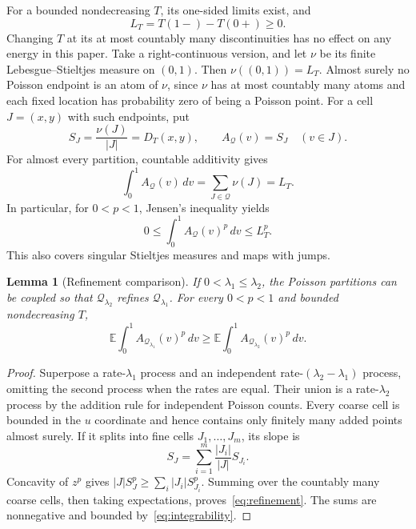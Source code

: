 \documentclass[11pt]{article}
\newtheorem{lemma}[theorem]{Lemma}
\theoremstyle{remark}
\newcommand{\E}{\mathbb E}
\newcommand{\dd}{\,d}
\begin{document}
For a bounded nondecreasing $T$, its one-sided limits exist, and
\[
 L_T=T(1-)-T(0+)\geq0.
\]
Changing $T$ at its at most countably many discontinuities has no effect
on any energy in this paper. Take a right-continuous version, and let
$\nu$ be its finite Lebesgue--Stieltjes measure on $(0,1)$.
Then $\nu((0,1))=L_T$.
Almost surely no Poisson endpoint is an atom of $\nu$, since $\nu$ has
at most countably many atoms and each fixed location has probability
zero of being a Poisson point.
For a cell $J=(x,y)$ with such endpoints, put
\[
 S_J=\frac{\nu(J)}{|J|}=D_T(x,y),
 \qquad A_{\mathcal Q}(v)=S_J\quad(v\in J).
\]
For almost every partition, countable additivity gives
\begin{equation}\label{eq:first-moment}
 \int_0^1 A_{\mathcal Q}(v)\dd v
 =\sum_{J\in\mathcal Q}\nu(J)=L_T.
\end{equation}
In particular, for $0<p<1$, Jensen's inequality yields
\begin{equation}\label{eq:integrability}
 0\leq\int_0^1 A_{\mathcal Q}(v)^p\dd v\leq L_T^p.
\end{equation}
This also covers singular Stieltjes measures and maps with jumps.

\begin{lemma}[Refinement comparison]\label{lem:refinement}
If $0<\lambda_1\leq\lambda_2$, the Poisson partitions can be coupled
so that $\mathcal Q_{\lambda_2}$ refines $\mathcal Q_{\lambda_1}$.
For every $0<p<1$ and bounded nondecreasing $T$,
\begin{equation}\label{eq:refinement}
 \E\int_0^1 A_{\mathcal Q_{\lambda_1}}(v)^p\dd v
 \geq
 \E\int_0^1 A_{\mathcal Q_{\lambda_2}}(v)^p\dd v.
\end{equation}
\end{lemma}

\begin{proof}
Superpose a rate-$\lambda_1$ process and an independent
rate-$(\lambda_2-\lambda_1)$ process, omitting the second process when
the rates are equal. Their union is a rate-$\lambda_2$ process by the
addition rule for independent Poisson counts.
Every coarse cell is bounded in the $u$ coordinate and hence contains
only finitely many added points almost surely.
If it splits into fine cells $J_1,\ldots,J_m$, its slope is
\[
 S_J=\sum_{i=1}^m\frac{|J_i|}{|J|}S_{J_i}.
\]
Concavity of $z^p$ gives
$|J|S_J^p\geq\sum_i|J_i|S_{J_i}^p$.
Summing over the countably many coarse cells, then taking expectations,
proves~\eqref{eq:refinement}. The sums are nonnegative and bounded
by~\eqref{eq:integrability}.
\end{proof}
\end{document}
